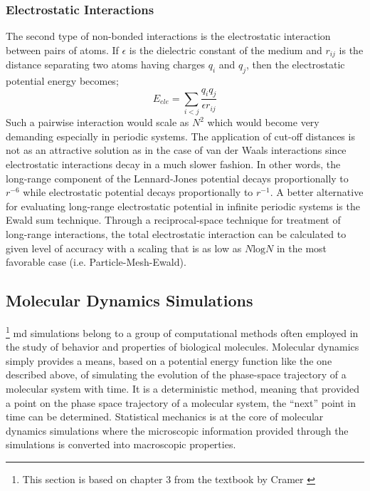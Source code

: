 \documentclass[11pt]{report}
\begin{document}
\subsubsection{Electrostatic Interactions}

The second type of non-bonded interactions
is the electrostatic interaction between pairs of
atoms. If $\epsilon$ is the dielectric constant of the medium and
$r_{ij}$ is the distance separating two atoms
having charges $q_i$ and $q_j$, then the electrostatic
potential energy becomes;
\begin{equation}
E_{ele} = \sum_{i<j} \frac{q_i q_j}{\epsilon r_{ij}}
\end{equation}
Such a pairwise interaction would scale as $N^2$ which 
would become very demanding especially in periodic systems.
The application of cut-off distances is not as an attractive solution
as in the case of van der Waals interactions since 
electrostatic interactions decay in a much slower
fashion. In other words, the long-range component of the Lennard-Jones potential decays proportionally to $r^{-6}$
while electrostatic potential decays proportionally to $r^{-1}$.
A better alternative for evaluating long-range electrostatic potential in infinite periodic
systems is the Ewald sum technique. Through a reciprocal-space
technique for treatment of long-range interactions,
the total electrostatic interaction can be calculated to 
given level of accuracy with a scaling that is as
low as $N\text{log}N$ in the 
most favorable case (i.e. Particle-Mesh-Ewald). 

\subsection{Molecular Dynamics Simulations}

\footnote{This section is based on chapter 3 from the textbook by Cramer
	\cite{Cramer2004}} \gls{md} simulations belong to a group of computational 
methods often employed in the study of behavior and properties
of biological molecules. Molecular dynamics simply
provides a means, based on a potential energy function like
the one described above, of simulating the evolution 
of the phase-space trajectory of a molecular system with time. It is a deterministic method,
meaning that provided a point on the phase space trajectory of a molecular
system, the ``next'' point in time can be determined.
Statistical mechanics is at the core of molecular dynamics
simulations where the microscopic information provided
through the simulations is converted into macroscopic
properties.
\end{document}
